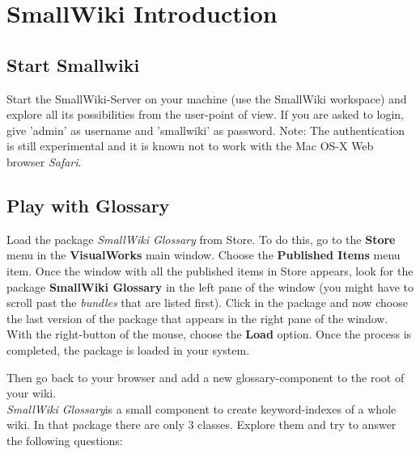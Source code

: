 \ifx\wholebook\relax\else


\fi


\chapter{SmallWiki Introduction}


\section{Start Smallwiki}
\exercise Start the SmallWiki-Server on your machine (use the SmallWiki workspace) and explore
all its possibilities from the user-point of view. If you are
asked to login, give 'admin' as username and 'smallwiki' as
password. Note: The authentication is still experimental and it is
known not to work with the Mac OS-X Web browser \emph{Safari}.

\section{Play with Glossary}


\exercise Load the package \textit{SmallWiki Glossary} from Store.
To do this, go to the \textbf{Store} menu in the
\textbf{VisualWorks} main window. Choose the \textbf{Published
Items} menu item. Once the window with all the published items in
Store appears, look for the package \textbf{SmallWiki Glossary} in
the left pane of the window (you might have to scroll past the \emph{bundles} that are listed first). Click in the package and now choose
the last version of the package that appears in the right pane of
the window. With the right-button of the mouse, choose the
\textbf{Load} option. Once the process is
completed, the package is loaded in your system.

Then go back to your browser and add a new
glossary-component to the root of your wiki. \\

\textit{SmallWiki Glossary}is a small component to create
keyword-indexes of a whole wiki. In that package there are only 3
classes. Explore them and try to answer the following questions:

